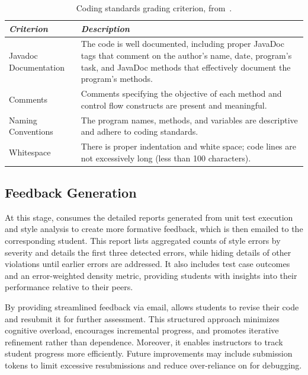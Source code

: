\begin{table}[tbp]
    \caption{Coding standards grading criterion, from~\cite{10590588}.}
    \centering
    \begin{tabular}{l p{}}
       \hline
       \textbf{\textit{Criterion}} & \textbf{\textit{Description}} \\  
       \hline
       \hline
       Javadoc Documentation & The code is well documented, including proper JavaDoc tags that comment on the author's name, date, program's task, and JavaDoc methods that effectively document the program's methods. \\
       Comments & Comments specifying the objective of each method and control flow constructs are present and meaningful. \\
       Naming Conventions & The program names, methods, and variables are descriptive and adhere to coding standards. \\
       Whitespace & There is proper indentation and white space; code lines are not excessively long (less than 100 characters). \\
       \hline
    \end{tabular}
    \label{tab1}
\end{table}

\subsection{Feedback Generation}
At this stage, \codeinspector consumes the detailed reports generated from unit test execution and style analysis to create more formative feedback, which is then emailed to the corresponding student. This report lists aggregated counts of style errors by severity and details the first three detected errors, while hiding details of other violations until earlier errors are addressed. It also includes test case outcomes and an error-weighted density metric, providing students with insights into their performance relative to their peers.

By providing streamlined feedback via email, \codeinspector allows students to revise their code and resubmit it for further assessment. This structured approach minimizes cognitive overload, encourages incremental progress, and promotes iterative refinement rather than dependence. Moreover, it enables instructors to track student progress more efficiently.  Future improvements may include submission tokens to limit excessive resubmissions and reduce over-reliance on \codeinspector for debugging. 

